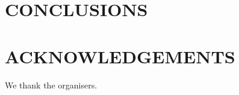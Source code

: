\section{CONCLUSIONS}
\label{sec:psunc:conclusions}




\section*{ACKNOWLEDGEMENTS}

We thank the organisers.